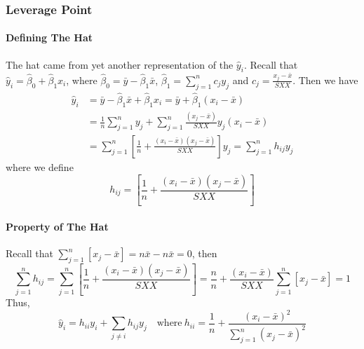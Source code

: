 \documentclass[11pt]{article}
\begin{document}
\subsubsection{Leverage Point}
\paragraph{Defining The Hat}
The hat came from yet another representation of the $\hat{y}_i$. Recall that $\hat{y}_{i}=\hat{\beta}_{0}+\hat{\beta}_{1} x_{i}$, where $\hat{\beta}_{0}=\bar{y}-\hat{\beta}_{1} \bar{x}$, $\hat{\beta}_{1}=\sum_{j=1}^{n} c_{j} y_{j}$ and $c_{j}=\frac{x_{j}-\bar{x}}{S X X}$.
Then we have
\begin{align*}
    \hat{y}_{i}	
    &=\bar{y}-\hat{\beta}_{1} \bar{x}+\hat{\beta}_{1} x_{i} 
    =\bar{y}+\hat{\beta}_{1}\left(x_{i}-\bar{x}\right) \\
    &=\frac{1}{n} \sum_{j=1}^{n} y_{j}+\sum_{j=1}^{n} \frac{\left(x_{j}-\bar{x}\right)}{S X X} y_{j}\left(x_{i}-\bar{x}\right) \\
    &=\sum_{j=1}^{n}\left[\frac{1}{n}+\frac{\left(x_{i}-\bar{x}\right)\left(x_{j}-\bar{x}\right)}{S X X}\right] y_{j} 
    =\sum_{j=1}^{n} h_{i j} y_{j}
\end{align*}
where we define
\begin{equation*}
    h_{i j}=\left[\frac{1}{n}+\frac{\left(x_{i}-\bar{x}\right)\left(x_{j}-\bar{x}\right)}{S X X}\right]
\end{equation*}
\paragraph{Property of The Hat}
Recall that $\sum_{j=1}^{n}\left[x_{j}-\bar{x}\right]=n\bar{x} - n\bar{x}=0$, then
\begin{equation*}
    \sum_{j=1}^{n} h_{i j}=\sum_{j=1}^{n}\left[\frac{1}{n}+\frac{\left(x_{i}-\bar{x}\right)\left(x_{j}-\bar{x}\right)}{S X X}\right]=\frac{n}{n}+\frac{\left(x_{i}-\bar{x}\right)}{S X X} \sum_{j=1}^{n}\left[x_{j}-\bar{x}\right]=1
\end{equation*}
Thus,
\begin{equation*}
    \hat{y}_{i}=h_{i i} y_{i}+\sum_{j \neq i} h_{i j} y_{j} \quad \text{where}~h_{i i}=\frac{1}{n}+\frac{\left(x_{i}-\bar{x}\right)^{2}}{\sum_{j=1}^{n}\left(x_{j}-\bar{x}\right)^{2}}
\end{equation*}
\end{document}
